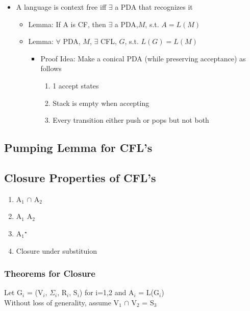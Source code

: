 \documentclass[11pt]{article}
\begin{document}
\begin{itemize}
\item A language is context free iff $\exists$ a PDA that recognizes it

\begin{itemize}
\item Lemma: If A is CF, then $\exists$ a PDA,$M$, s.t. $A = L(M)$
\item Lemma: $\forall$ PDA, $M$, $\exists$ CFL, $G$, s.t. $L(G)=L(M)$

\begin{itemize}
\item Proof Idea: Make a conical PDA (while preserving acceptance)
         as follows

\begin{enumerate}
\item 1 accept states
\item Stack is empty when accepting
\item Every transition either push or pops but not both
\end{enumerate}

\end{itemize}

\end{itemize}

\end{itemize}
\subsection{Pumping Lemma for CFL's}
\label{sec-3.6}

\subsection{Closure Properties of CFL's}
\label{sec-3.7}

\begin{enumerate}
\item A$_1$ $\cap$ A$_2$
\item A$_1$ \cdot A$_2$
\item A$_1$$^{\star}$
\item Closure under substituion
\end{enumerate}
\subsubsection{Theorems for Closure}
\label{sec-3.7.1}

    Let G$_i$ = (V$_i$, $\Sigma$$_i$, R$_i$, S$_i$) for i=1,2 and A$_i$ =
    L(G$_i$)\\
    Without loss of generality, assume V$_1$ $\cap$ V$_2$ = \emptyset \wedge
    S$_3$
    
\end{document}
